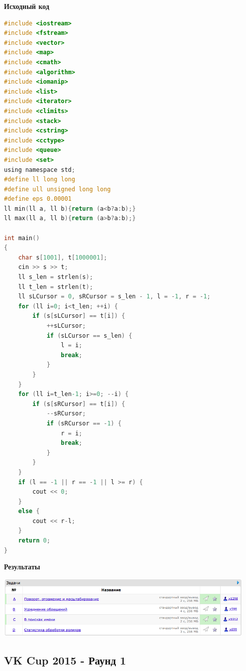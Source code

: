 \documentclass[a4paper,12pt]{article}
\begin{document}
\textbf{{\large Исходный код}}
\begin{lstlisting}[language=C]
#include <iostream>
#include <fstream>
#include <vector>
#include <map>
#include <cmath>
#include <algorithm>
#include <iomanip>
#include <list>
#include <iterator>
#include <climits>
#include <stack>
#include <cstring>
#include <cctype>
#include <queue>
#include <set>
using namespace std;
#define ll long long
#define ull unsigned long long
#define eps 0.00001
ll min(ll a, ll b){return (a<b?a:b);}
ll max(ll a, ll b){return (a>b?a:b);}

int main()
{
    char s[1001], t[1000001];
    cin >> s >> t;
    ll s_len = strlen(s);
    ll t_len = strlen(t);
    ll sLCursor = 0, sRCursor = s_len - 1, l = -1, r = -1;
    for (ll i=0; i<t_len; ++i) {
        if (s[sLCursor] == t[i]) {
            ++sLCursor;
            if (sLCursor == s_len) {
                l = i;
                break;
            }
        }
    }
    for (ll i=t_len-1; i>=0; --i) {
        if (s[sRCursor] == t[i]) {
            --sRCursor;
            if (sRCursor == -1) {
                r = i;
                break;
            }
        }
    }
    if (l == -1 || r == -1 || l >= r) {
        cout << 0;
    }
    else {
        cout << r-l;
    }
    return 0;
}
\end{lstlisting}

\textbf{{\large Результаты}} \\
\begin{center}
\includegraphics[width=0.95\textwidth]{VK_Qual_2/A_VK_Qual_result.png}\\ [1cm]
\end{center}

%
%

\newpage
\subsection{ VK Cup 2015 - Раунд 1}
\end{document}
